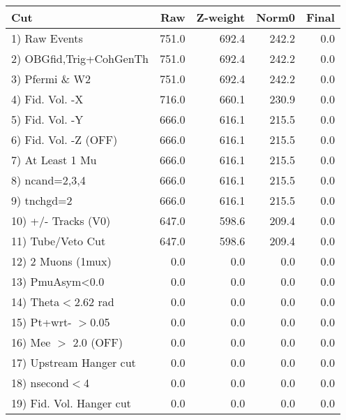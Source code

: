  \begin{table}[h!]\centering
 \begin{tabular}{||l||r|r|r|r||}
 \hline
 \hline
 Cut & Raw & Z-weight & Norm0 & Final \\
 \hline
  1) Raw Events           &       751.0 &       692.4 &       242.2 &         0.0 \\
  2) OBGfid,Trig+CohGenTh &       751.0 &       692.4 &       242.2 &         0.0 \\
  3) Pfermi \& W2         &       751.0 &       692.4 &       242.2 &         0.0 \\
  4) Fid. Vol. -X         &       716.0 &       660.1 &       230.9 &         0.0 \\
  5) Fid. Vol. -Y         &       666.0 &       616.1 &       215.5 &         0.0 \\
  6) Fid. Vol. -Z (OFF)   &       666.0 &       616.1 &       215.5 &         0.0 \\
  7) At Least 1 Mu        &       666.0 &       616.1 &       215.5 &         0.0 \\
  8) ncand=2,3,4          &       666.0 &       616.1 &       215.5 &         0.0 \\
  9) tnchgd=2             &       666.0 &       616.1 &       215.5 &         0.0 \\
 10) +/- Tracks (V0)      &       647.0 &       598.6 &       209.4 &         0.0 \\
 11) Tube/Veto Cut        &       647.0 &       598.6 &       209.4 &         0.0 \\
 12) 2 Muons (1mux)       &         0.0 &         0.0 &         0.0 &         0.0 \\
 13) PmuAsym<0.0          &         0.0 &         0.0 &         0.0 &         0.0 \\
 14) Theta$<$2.62 rad     &         0.0 &         0.0 &         0.0 &         0.0 \\
 15) Pt+wrt- $>$0.05      &         0.0 &         0.0 &         0.0 &         0.0 \\
 16) Mee $>$ 2.0  (OFF)   &         0.0 &         0.0 &         0.0 &         0.0 \\
 17) Upstream Hanger cut  &         0.0 &         0.0 &         0.0 &         0.0 \\
 18) nsecond$<$4          &         0.0 &         0.0 &         0.0 &         0.0 \\
 19) Fid. Vol. Hanger cut &         0.0 &         0.0 &         0.0 &         0.0 \\

\end{tabular}
\end{table}
